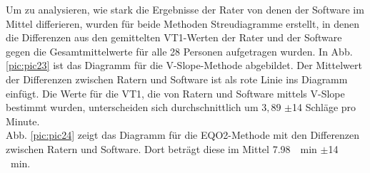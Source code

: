 %
Um zu analysieren, wie stark die Ergebnisse der Rater von denen der Software im Mittel differieren, wurden für beide Methoden Streudiagramme erstellt, in denen die Differenzen aus den gemittelten VT1-Werten der Rater und der Software gegen die Gesamtmittelwerte für alle 28 Personen aufgetragen wurden. In Abb. \ref{pic:pic23} ist das Diagramm für die V-Slope-Methode abgebildet. Der Mittelwert der Differenzen zwischen Ratern und Software ist als rote Linie ins Diagramm einfügt. Die Werte für die VT1, die von Ratern und Software mittels V-Slope bestimmt wurden, unterscheiden sich durchschnittlich um $3,89$ $\pm$14 Schläge pro Minute.\\
Abb. \ref{pic:pic24} zeigt das Diagramm für die \gls{EQO2}-Methode mit den Differenzen zwischen Ratern und Software. Dort beträgt diese im Mittel \SI{7,98}{\per\minute} $\pm$14 \si{\per\minute}.
%
